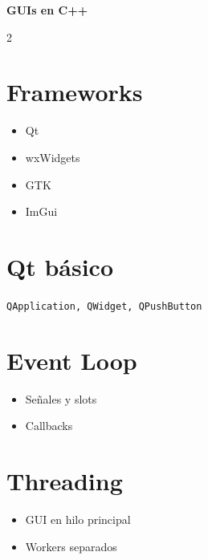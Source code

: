\documentclass[a4paper,10pt]{article}
\begin{document}
\begin{center}
{\Large \textbf{GUIs en C++}}
\end{center}

\begin{multicols}{2}

\section*{Frameworks}
\begin{itemize}
\item Qt
\item wxWidgets
\item GTK
\item ImGui
\end{itemize}

\section*{Qt básico}
\texttt{QApplication, QWidget, QPushButton}

\section*{Event Loop}
\begin{itemize}
\item Señales y slots
\item Callbacks
\end{itemize}

\section*{Threading}
\begin{itemize}
\item GUI en hilo principal
\item Workers separados
\end{itemize}

\end{multicols}
\end{document}
